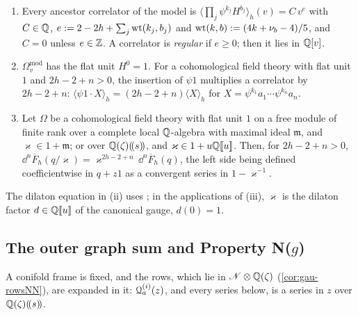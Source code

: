 \begin{lem}
\label{lem:set-dilaton}
\begin{enumerate}
\item Every ancestor correlator of the model is $\langle\prod_j\psi^{k_j}H^{b_j}\rangle_h(v)=C\,v^e$ with $C\in\mathbb{Q}$, $e:=2-2h+\sum_j\operatorname{wt}(k_j,b_j)$ and $\operatorname{wt}(k,b):=(4k+\nu_b-4)/5$, and $C=0$ unless $e\in\mathbb{Z}$. A correlator is \emph{regular} if $e\geq0$; then it lies in $\mathbb{Q}[v]$.
\item $\Omega^{\mathrm{mod}}_v$ has the flat unit $H^0=1$. For a cohomological field theory with flat unit $1$ and $2h-2+n>0$, the insertion of $\psi1$ multiplies a correlator by $2h-2+n$: $\langle\psi1\cdot X\rangle_h=(2h-2+n)\langle X\rangle_h$ for $X=\psi^{k_1}a_1\cdots\psi^{k_n}a_n$.
\item Let $\Omega$ be a cohomological field theory with flat unit $1$ on a free module of finite rank over a complete local $\mathbb{Q}$-algebra with maximal ideal $\mathfrak m$, and $\varkappa\in1+\mathfrak m$; or over $\mathbb{Q}(\zeta)(\!(s)\!)$, and $\varkappa\in1+u\mathbb{Q}[\![ u ]\!]$. Then, for $2h-2+n>0$, $\dd^n\overline F_h(q/\varkappa)=\varkappa^{2h-2+n}\,\dd^n\overline F_h(q)$, the left side being defined coefficientwise in $q+z1$ as a convergent series in $1-\varkappa^{-1}$.
\end{enumerate}
\end{lem}

The dilaton equation in (ii) uses \cite[(1.7)]{AC96}; in the applications of (iii), $\varkappa$ is the dilaton factor $d\in\mathbb{Q}[\![ u ]\!]$ of the canonical gauge, $d(0)=1$.

\subsection{The outer graph sum and Property N(\texorpdfstring{$g$}{g})}
\label{sec:set-hat}

A conifold frame is fixed, and the rows, which lie in $\mathscr{N}\otimes\mathbb{Q}(\zeta)$ (\cref{cor:gau-rowsNN}), are expanded in it: $\mathcal{Q}^{(i)}_a(z)$, and every series below, is a series in $z$ over $\mathbb{Q}(\zeta)(\!(s)\!)$.

